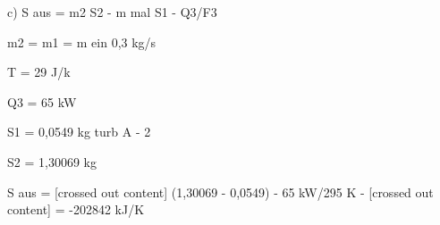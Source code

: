 c) S aus = m2 S2 - m mal S1 - Q3/F3

m2 = m1 = m ein 0,3 kg/s

T = 29 J/k

Q3 = 65 kW

S1 = 0,0549 kg turb A - 2

S2 = 1,30069 kg

S aus = [crossed out content] (1,30069 - 0,0549) - 65 kW/295 K - [crossed out content] = -202842 kJ/K
